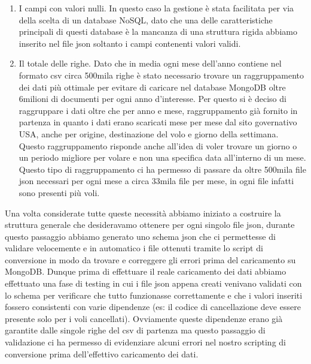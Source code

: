 \documentclass[12pt]{article}
\begin{document}
\begin{enumerate}
    \item I campi con valori nulli. In questo caso la gestione è stata facilitata per via della scelta di un database NoSQL, dato che una delle caratteristiche principali di questi database è la mancanza di una struttura rigida abbiamo inserito nel file json soltanto i campi contenenti valori validi.
    \item Il totale delle righe. Dato che in media ogni mese dell'anno contiene nel formato csv circa 500mila righe è stato necessario trovare un raggruppamento dei dati più ottimale per evitare di caricare nel database MongoDB oltre 6milioni di documenti per ogni anno d'interesse. Per questo si è deciso di raggruppare i dati oltre che per anno e mese, raggruppamento già fornito in partenza in quanto i dati erano scaricati mese per mese dal sito governativo USA, anche per origine, destinazione del volo e giorno della settimana. Questo raggruppamento risponde anche all'idea di voler trovare un giorno o un periodo migliore per volare e non una specifica data all'interno di un mese. Questo tipo di raggruppamento ci ha permesso di passare da oltre 500mila file json necessari per ogni mese a circa 33mila file per mese, in ogni file infatti sono presenti più voli.
\end{enumerate}
Una volta considerate tutte queste necessità abbiamo iniziato a costruire la struttura generale che desideravamo ottenere per ogni singolo file json, durante questo passaggio abbiamo generato uno schema json che ci permettesse di validare velocemente e in automatico i file ottenuti tramite lo script di conversione in modo da trovare e correggere gli errori prima del caricamento su MongoDB. Dunque prima di effettuare il reale caricamento dei dati abbiamo effettuato una fase di testing in cui i file json appena creati venivano validati con lo schema per verificare che tutto funzionasse correttamente e che i valori inseriti fossero consistenti con varie dipendenze (es: il codice di cancellazione deve essere presente solo per i voli cancellati). Ovviamente queste dipendenze erano già garantite dalle singole righe del csv di partenza ma questo passaggio di validazione ci ha permesso di evidenziare alcuni errori nel nostro scripting di conversione prima dell'effettivo caricamento dei dati.
\end{document}
